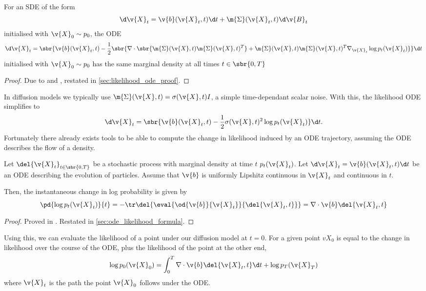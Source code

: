\begin{theorem}
	\label{thm:likelihood_ode}
	For an SDE of the form 
	\[\d \v{X}_t = \v{b}(\v{X}_t, t) \d t + \m{\Sigma}(\v{X}_t, t) \d \v{B}_t \]
	initialised with \(\v{X}_0 \sim p_0\), the ODE
	\[\d \v{X}_t = \sbr{\v{b}(\v{X}_t, t) - \frac{1}{2}\sbr{\nabla \cdot \sbr{\m{\Sigma}(\v{X}, t) \m{\Sigma}(\v{X}, t)^T}\nonumber +\m{\Sigma}(\v{X}, t) \m{\Sigma}(\v{X}, t)^T \nabla_{\v{X}_t}\log p_t(\v{X}_t)}} \d t\]
	initialised with \(\v{X}_0 \sim p_0\) has the same marginal density at all times \(t\in\sbr{0,T}\)
\end{theorem}
\begin{proof}
	Due to \textcite{maoutsa2020interacting} and \textcite[appendix D]{song2020score}, restated in \cref{sec:likelihood_ode_proof}.
\end{proof}
In diffusion models we typically use \(\m{\Sigma}(\v{X}, t) = \sigma(\v{X}, t) I\), a simple time-dependant scalar noise.
With this, the likelihood ODE simplifies to
\[\d \v{X}_t = \sbr{\v{b}(\v{X}_t, t) - \frac{1}{2}\sigma(\v{X}, t)^2 \log p_t(\v{X}_t)} \d t \label{eq:likelihood_ode_drift} .\]
Fortunately there already exists tools to be able to compute the change in likelihood induced by an ODE trajectory, assuming the ODE describes the flow of a density.
\begin{theorem}
	Let \(\del{\v{X}_t}_{t\in\sbr{0,T}}\) be a stochastic process with marginal density at time \(t\) \(p_t(\v{X}_t)\).
	Let \(\d \v{X}_t = \v{b}(\v{X}_t, t) \d t\) be an ODE describing the evolution of particles.
	Assume that \(\v{b}\) is uniformly Lipshitz continuous in \(\v{X}_t\) and continuous in \(t\).

	Then, the instantaneous change in log probability is given by 
	\[\pd{\log p_t(\v{X}_t)}{t} = -\tr\del{\eval{\od{\v{b}}{\v{X}_t}}{\del{\v{X}_t, t}}} = \nabla \cdot \v{b}\del{\v{X}_t, t}\]
\end{theorem}
\begin{proof}
	Proved in \textcite[appendix A]{chen2018neural}. Restated in \cref{sec:ode_likelihood_formula}.
\end{proof}
Using this, we can evaluate the likelihood of a point under our diffusion model at \(t=0\).
For a given point \(v{X}_0\) is equal to the change in likelihood over the course of the ODE, plus the likelihood of the point at the other end, \[\log p_0(\v{X}_0) = \int_0^T \nabla \cdot \v{b}\del{\v{X}_t, t} \d t + \log p_T(\v{X}_T)\]
where \(\v{X}_t\) is the path the point \(\v{X}_0\) follows under the ODE.

